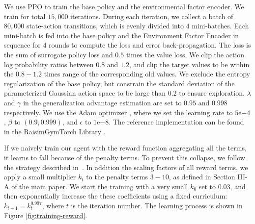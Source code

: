 We use PPO \cite{schulman2017proximal} to train the base policy and the environmental factor encoder. We train for total $15,000$ iterations. During each iteration, we collect a batch of $80,000$ state-action transitions, which is evenly divided into $4$ mini-batches. Each mini-batch is fed into the base policy and the Environment Factor Encoder in sequence for 4 rounds to compute the loss and error back-propagation. The loss is the sum of surrogate policy loss and $0.5$ times the value loss. We clip the action log probability ratios between $0.8$ and $1.2$, and clip the target values to be within the $0.8 - 1.2$ times range of the corresponding old values. We exclude the entropy regularization of the base policy, but constrain the standard deviation of the parameterized Gaussian action space to be large than $0.2$ to ensure exploration. $\lambda$ and $\gamma$ in the generalization advantage estimation \cite{schulman2016gae} are set to $0.95$ and $0.998$ respectively. We use the Adam optimizer \cite{kingma2014adam}, where we set the learning rate to $5\mathrm{e}{-4}$, $\beta$ to $(0.9, 0.999)$, and $\epsilon$ to $1\mathrm{e}{-8}$. The reference implementation can be found in the RaisimGymTorch Library \cite{raisimgymtorch}. 

If we naively train our agent with the reward function aggregating all the terms, it learns to fall because of the penalty terms. To prevent this collapse, we follow the strategy described in~\cite{hwangbo2019learning}. In addition the scaling factors of all reward terms, we apply a small multiplier $k_t$ to the penalty terms $3-10$, as defined in Section III-A of the main paper. We start the training with a very small $k_0$ set to $0.03$, and then exponentially increase the these coefficients using a fixed curriculum: $k_{t+1} = k_{t}^{0.997}$, where $t$ is the iteration number. The learning process is shown in Figure \ref{fig:training-reward}. 

